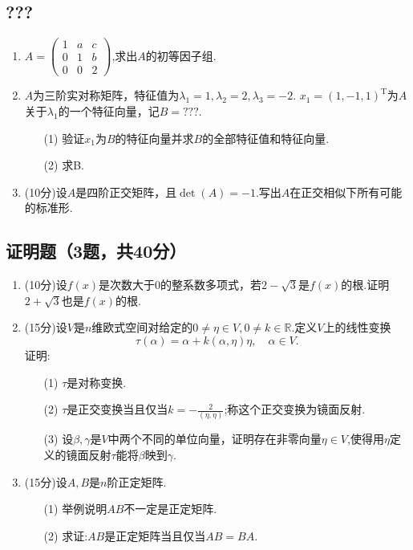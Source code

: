 \subsection*{???}

\begin{enumerate}
    \item $A=\begin{pmatrix}
        1 &a &c\\
        0 &1 &b\\
        0 &0 &2
    \end{pmatrix}$,求出$A$的初等因子组.
    \item $A$为三阶实对称矩阵，特征值为$\lambda_1=1,\lambda_2=2,\lambda_3=-2$. $x_1=(1,-1,1)^\text{T}$为$A$关于$\lambda_1$的一个特征向量，记$B=???$.
    \begin{enumerate}
        \item[(1)] 验证$x_1$为$B$的特征向量并求$B$的全部特征值和特征向量.
        \item[(2)] 求B.
    \end{enumerate}
    \item (10分)设$A$是四阶正交矩阵，且$\operatorname{det}(A)=-1$.写出$A$在正交相似下所有可能的标准形.
\end{enumerate}

\subsection*{证明题（3题，共40分）}

\begin{enumerate}
    \item (10分)设$f(x)$是次数大于0的整系数多项式，若$2-\sqrt{3}$是$f(x)$的根.证明$2+\sqrt{3}$也是$f(x)$的根.
    \item (15分)设$V$是$n$维欧式空间对给定的$0 \not=\eta \in V,0\not=k \in \mathbb{R}$.定义$V$上的线性变换
    \[\tau(\alpha)=\alpha+k(\alpha,\eta)\eta,\quad \alpha \in V.\]
    证明:
    \begin{enumerate}
        \item[(1)] $\tau$是对称变换.
        \item[(2)] $\tau$是正交变换当且仅当$k=-\frac{2}{(\eta,\eta)}$;称这个正交变换为镜面反射.
        \item[(3)] 设$\beta,\gamma$是$V$中两个不同的单位向量，证明存在非零向量$\eta \in V$,使得用$\eta$定义的镜面反射$\tau$能将$\beta$映到$\gamma$.
    \end{enumerate}
    \item (15分)设$A,B$是$n$阶正定矩阵.
    \begin{enumerate}
        \item[(1)] 举例说明$AB$不一定是正定矩阵.
        \item[(2)] 求证:$AB$是正定矩阵当且仅当$AB=BA$.
    \end{enumerate}
\end{enumerate}